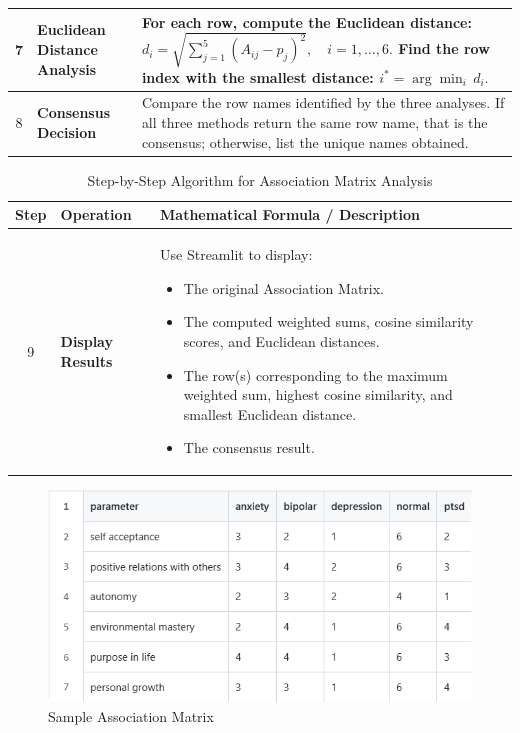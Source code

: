 \begin{table}[H]
\begin{tabularx}{\textwidth}{|c|p{6cm}|>{\raggedright\arraybackslash}X|}
    7 & \textbf{Euclidean Distance Analysis} & For each row, compute the Euclidean distance:
    \( \displaystyle d_i = \sqrt{\sum_{j=1}^{5} \left(A_{ij} - p_j\right)^2}, \quad i=1,\dots,6. \)
    Find the row index with the smallest distance:
    \( \displaystyle i^* = \arg\min_{i}\, d_i. \) \newline \\ \hline
    8 & \textbf{Consensus Decision} & Compare the row names identified by the three analyses. If all three methods return the same row name, that is the consensus; otherwise, list the unique names obtained. \\ \hline
\end{tabularx}
\end{table}

\begin{table}[H]
    \centering
    \caption*{Step-by-Step Algorithm for Association Matrix Analysis}
    \label{tab:algorithm}
    \begin{tabularx}{\textwidth}{|c|p{6cm}|>{\raggedright\arraybackslash}X|}
    \hline
    \textbf{Step} & \textbf{Operation} & \textbf{Mathematical Formula / Description} \\ \hline
    9 & \textbf{Display Results} & Use Streamlit to display:
    \begin{itemize}[noitemsep, topsep=0pt]
        \item The original Association Matrix.
        \item The computed weighted sums, cosine similarity scores, and Euclidean distances.
        \item The row(s) corresponding to the maximum weighted sum, highest cosine similarity, and smallest Euclidean distance.
        \item The consensus result.
    \end{itemize} \\ \hline
    \end{tabularx}
\end{table}

\begin{figure}[h!]  
    \centering
    \includegraphics[width=1.0\textwidth]{App Images/33 Interface.png}  
    \caption{Sample Association Matrix}
    \label{01i}  %
\end{figure}

